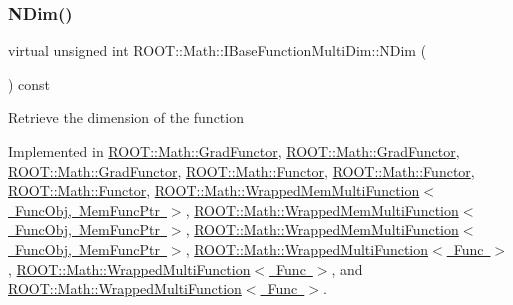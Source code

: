 \subsubsection{\texorpdfstring{NDim()}{NDim()}\hspace{0.1cm}{\footnotesize\ttfamily [3/3]}}
{\footnotesize\ttfamily virtual unsigned int R\+O\+O\+T\+::\+Math\+::\+I\+Base\+Function\+Multi\+Dim\+::\+N\+Dim (\begin{DoxyParamCaption}{ }\end{DoxyParamCaption}) const\hspace{0.3cm}{\ttfamily [pure virtual]}}

Retrieve the dimension of the function 

Implemented in \mbox{\hyperlink{classROOT_1_1Math_1_1GradFunctor_a7ff4ed4ad6f7c17d74403a443990f069}{R\+O\+O\+T\+::\+Math\+::\+Grad\+Functor}}, \mbox{\hyperlink{classROOT_1_1Math_1_1GradFunctor_a7ff4ed4ad6f7c17d74403a443990f069}{R\+O\+O\+T\+::\+Math\+::\+Grad\+Functor}}, \mbox{\hyperlink{classROOT_1_1Math_1_1GradFunctor_a7ff4ed4ad6f7c17d74403a443990f069}{R\+O\+O\+T\+::\+Math\+::\+Grad\+Functor}}, \mbox{\hyperlink{classROOT_1_1Math_1_1Functor_a2544e2ed3c6a0420084c7b08eb3c3130}{R\+O\+O\+T\+::\+Math\+::\+Functor}}, \mbox{\hyperlink{classROOT_1_1Math_1_1Functor_a2544e2ed3c6a0420084c7b08eb3c3130}{R\+O\+O\+T\+::\+Math\+::\+Functor}}, \mbox{\hyperlink{classROOT_1_1Math_1_1Functor_a2544e2ed3c6a0420084c7b08eb3c3130}{R\+O\+O\+T\+::\+Math\+::\+Functor}}, \mbox{\hyperlink{classROOT_1_1Math_1_1WrappedMemMultiFunction_ae9aaf3de1f2e1e6e1c1310fccdb06009}{R\+O\+O\+T\+::\+Math\+::\+Wrapped\+Mem\+Multi\+Function$<$ Func\+Obj, Mem\+Func\+Ptr $>$}}, \mbox{\hyperlink{classROOT_1_1Math_1_1WrappedMemMultiFunction_ae9aaf3de1f2e1e6e1c1310fccdb06009}{R\+O\+O\+T\+::\+Math\+::\+Wrapped\+Mem\+Multi\+Function$<$ Func\+Obj, Mem\+Func\+Ptr $>$}}, \mbox{\hyperlink{classROOT_1_1Math_1_1WrappedMemMultiFunction_ae9aaf3de1f2e1e6e1c1310fccdb06009}{R\+O\+O\+T\+::\+Math\+::\+Wrapped\+Mem\+Multi\+Function$<$ Func\+Obj, Mem\+Func\+Ptr $>$}}, \mbox{\hyperlink{classROOT_1_1Math_1_1WrappedMultiFunction_a99de9f7a6e26b03b1cdcf35d8c62d761}{R\+O\+O\+T\+::\+Math\+::\+Wrapped\+Multi\+Function$<$ Func $>$}}, \mbox{\hyperlink{classROOT_1_1Math_1_1WrappedMultiFunction_a99de9f7a6e26b03b1cdcf35d8c62d761}{R\+O\+O\+T\+::\+Math\+::\+Wrapped\+Multi\+Function$<$ Func $>$}}, and \mbox{\hyperlink{classROOT_1_1Math_1_1WrappedMultiFunction_a99de9f7a6e26b03b1cdcf35d8c62d761}{R\+O\+O\+T\+::\+Math\+::\+Wrapped\+Multi\+Function$<$ Func $>$}}.

\mbox{\label{classROOT_1_1Math_1_1IBaseFunctionMultiDim_a7efd1892dc6473b3f8aaaff3cbb8bb2f}} 

